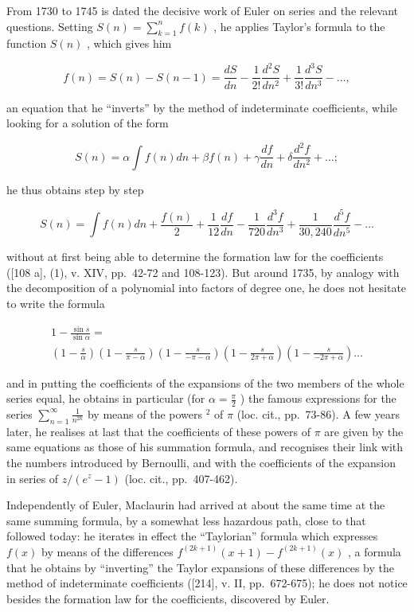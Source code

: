 From 1730 to 1745 is dated the decisive work of Euler on series and the relevant questions. Setting \(S(n) = \sum_{k=1}^{n} f(k)\) , he applies Taylor's formula to the function \(S(n)\) , which gives him

\[
f (n) = S (n) - S (n - 1) = \frac {d S}{d n} - \frac {1}{2 !} \frac {d ^ {2} S}{d n ^ {2}} + \frac {1}{3 !} \frac {d ^ {3} S}{d n ^ {3}} - \dots ,
\]

an equation that he ``inverts'' by the method of indeterminate coefficients, while looking for a solution of the form

\[
S (n) = \alpha \int f (n) d n + \beta f (n) + \gamma \frac {d f}{d n} + \delta \frac {d ^ {2} f}{d n ^ {2}} + \dots ;
\]

he thus obtains step by step

\[
S (n) = \int f (n) d n + \frac {f (n)}{2} + \frac {1}{12} \frac {d f}{d n} - \frac {1}{720} \frac {d ^ {3} f}{d n ^ {3}} + \frac {1}{30,240} \frac {d ^ {5} f}{d n ^ {5}} - \dots
\]

without at first being able to determine the formation law for the coefficients ({[}108 a{]}, (1), v. XIV, pp.~42-72 and 108-123). But around 1735, by analogy with the decomposition of a polynomial into factors of degree one, he does not hesitate to write the formula

\[
\begin{array}{c} 1 - \frac {\sin s}{\sin \alpha} = \\ \left(1 - \frac {s}{\alpha}\right) \left(1 - \frac {s}{\pi - \alpha}\right) \left(1 - \frac {s}{- \pi - \alpha}\right) \left(1 - \frac {s}{2 \pi + \alpha}\right) \left(1 - \frac {s}{- 2 \pi + \alpha}\right) \dots \end{array}
\]

and in putting the coefficients of the expansions of the two members of the whole series equal, he obtains in particular (for \(\alpha = \frac{\pi}{2}\) ) the famous expressions for the series \(\sum_{n=1}^{\infty} \frac{1}{n^{2k}}\) by means of the powers \(^2\) of \(\pi\) (loc. cit., pp.~73-86). A few years later, he realises at last that the coefficients of these powers of \(\pi\) are given by the same equations as those of his summation formula, and recognises their link with the numbers introduced by Bernoulli, and with the coefficients of the expansion in series of \(z/(e^z - 1)\) (loc. cit., pp.~407-462).

Independently of Euler, Maclaurin had arrived at about the same time at the same summing formula, by a somewhat less hazardous path, close to that followed today: he iterates in effect the ``Taylorian'' formula which expresses \(f(x)\) by means of the differences \(f^{(2k + 1)}(x + 1) - f^{(2k + 1)}(x)\) , a formula that he obtains by ``inverting'' the Taylor expansions of these differences by the method of indeterminate coefficients ({[}214{]}, v. II, pp.~672-675); he does not notice besides the formation law for the coefficients, discovered by Euler.

